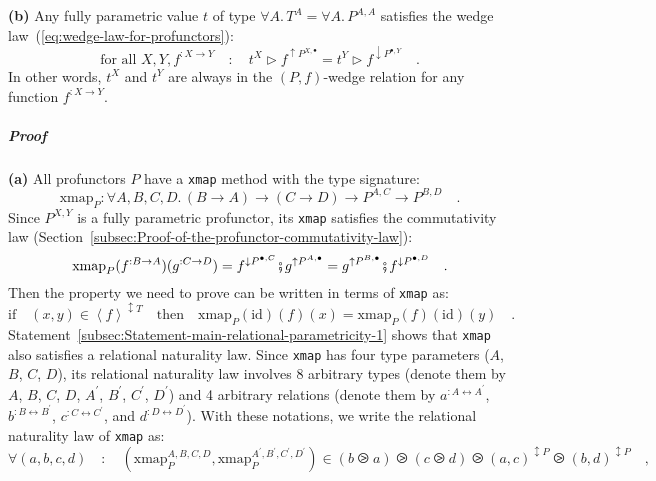 \textbf{(b)} Any fully parametric value $t$ of type $\forall A.\,T^{A}=\forall A.\,P^{A,A}$
satisfies the wedge law~(\ref{eq:wedge-law-for-profunctors}):
\[
\text{for all }X,Y,f^{:X\rightarrow Y}\quad:\quad t^{X}\triangleright f^{\uparrow P^{X,\bullet}}=t^{Y}\triangleright f^{\downarrow P^{\bullet,Y}}\quad.
\]
In other words, $t^{X}$ and $t^{Y}$ are always in the $(P,f)$-wedge
relation for any function $f^{:X\rightarrow Y}$.

\subparagraph{Proof}

\textbf{(a)} All profunctors $P$ have a \lstinline!xmap! method
with the type signature:
\[
\text{xmap}_{P}:\forall A,B,C,D.\,\left(B\rightarrow A\right)\rightarrow\left(C\rightarrow D\right)\rightarrow P^{A,C}\rightarrow P^{B,D}\quad.
\]
Since $P^{X,Y}$ is a fully parametric profunctor, its \lstinline!xmap!
satisfies the commutativity law (Section~\ref{subsec:Proof-of-the-profunctor-commutativity-law}):
\[
\text{xmap}_{P}(f^{:B\rightarrow A})(g^{:C\rightarrow D})=f^{\downarrow P^{\bullet,C}}\bef g^{\uparrow P^{A,\bullet}}=g^{\uparrow P^{B,\bullet}}\bef f^{\downarrow P^{\bullet,D}}\quad.
\]
Then the property we need to prove can be written in terms of \lstinline!xmap!
as:
\begin{equation}
\text{if}\quad(x,y)\in\left<f\right>^{\updownarrow T}\quad\text{then}\quad\text{xmap}_{P}(\text{id})(f)(x)=\text{xmap}_{P}(f)(\text{id})(y)\quad.\label{eq:wedge-law-from-parametricity-derivation1}
\end{equation}
Statement~\ref{subsec:Statement-main-relational-parametricity-1}
shows that \lstinline!xmap! also satisfies a relational naturality
law. Since \lstinline!xmap! has four type parameters ($A$, $B$,
$C$, $D$), its relational naturality law involves 8 arbitrary types
(denote them by $A$, $B$, $C$, $D$, $A^{\prime}$, $B^{\prime}$,
$C^{\prime}$, $D^{\prime}$) and 4 arbitrary relations (denote them
by $a^{:A\leftrightarrow A^{\prime}}$, $b^{:B\leftrightarrow B^{\prime}}$,
$c^{:C\leftrightarrow C^{\prime}}$, and $d^{:D\leftrightarrow D^{\prime}}$).
With these notations, we write the relational naturality law of \lstinline!xmap!
as:
\begin{equation}
\forall(a,b,c,d)\quad:\quad(\text{xmap}_{P}^{A,B,C,D},\text{xmap}_{P}^{A^{\prime},B^{\prime},C^{\prime},D^{\prime}})\in(b\ogreaterthan a)\ogreaterthan(c\ogreaterthan d)\ogreaterthan(a,c)^{\updownarrow P}\ogreaterthan(b,d)^{\updownarrow P}\quad,\label{eq:relational-naturality-law-of-xmap}
\end{equation}
